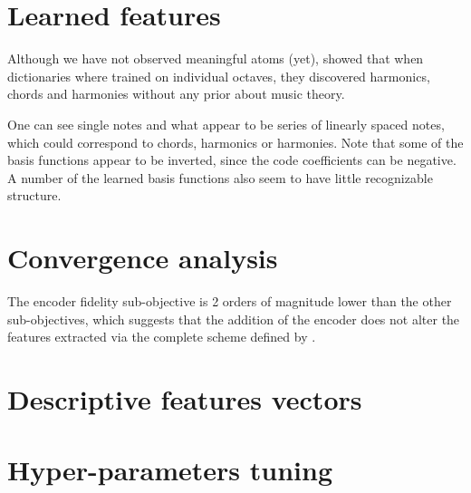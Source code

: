 
\section{Learned features}

Although we have not observed meaningful atoms (yet), \cite{lecun2010PSD} showed that when dictionaries where trained on individual octaves, they discovered harmonics, chords and harmonies without any prior about music theory.

One can see single notes and what appear to be series of linearly
spaced notes, which could correspond to chords, harmonics
or harmonies. Note that some of the basis functions appear
to be inverted, since the code coefficients can be negative.
A number of the learned basis functions also seem to have
little recognizable structure.


\section{Convergence analysis}

The encoder fidelity sub-objective is 2 orders of magnitude lower than the other sub-objectives, which suggests that the addition of the encoder does not alter the features extracted via the complete scheme defined by .

\section{Descriptive features vectors}

\section{Hyper-parameters tuning}


